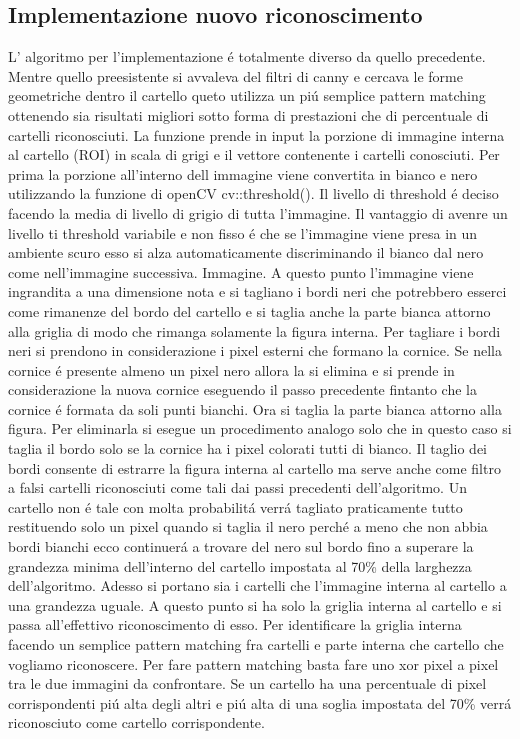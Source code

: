 	\subsection{Implementazione nuovo riconoscimento}
		L' algoritmo per l'implementazione \'e totalmente diverso da quello precedente. Mentre quello preesistente si avvaleva del filtri di canny e cercava le forme geometriche dentro il cartello queto utilizza un pi\'u semplice pattern matching ottenendo sia risultati migliori sotto forma di prestazioni che di percentuale di cartelli riconosciuti.\newline
		La funzione prende in input la porzione di immagine interna al cartello (ROI) in scala di grigi e il vettore contenente i cartelli conosciuti. Per prima la porzione all'interno dell immagine viene convertita in bianco e nero utilizzando la funzione di openCV cv::threshold(). Il livello di threshold \'e deciso facendo la media di livello di grigio di tutta l'immagine. Il vantaggio di avenre un livello ti threshold variabile e non fisso \'e che se l'immagine viene presa in un ambiente scuro esso si alza automaticamente discriminando il bianco dal nero come nell'immagine successiva.
		Immagine.
		\newline A questo punto l'immagine viene ingrandita a una dimensione nota e si tagliano i bordi neri che potrebbero esserci come rimanenze del bordo del cartello e si taglia anche la parte bianca attorno alla griglia di modo che rimanga solamente la figura interna. Per tagliare i bordi neri si prendono in considerazione i pixel esterni che formano la cornice. Se nella cornice \'e presente almeno un pixel nero allora la si elimina e si prende in considerazione la nuova cornice eseguendo il passo precedente fintanto che la cornice \'e formata da soli punti bianchi. Ora si taglia la parte bianca attorno alla figura. Per eliminarla si esegue un procedimento analogo solo che in questo caso si taglia il bordo solo se la cornice ha i pixel colorati tutti di bianco. Il taglio dei bordi consente di estrarre la figura interna al cartello ma serve anche come filtro a falsi cartelli riconosciuti come tali dai passi precedenti dell'algoritmo. Un cartello non \'e tale con molta probabilit\'a verr\'a tagliato praticamente tutto restituendo solo un pixel quando si taglia il nero perch\'e a meno che non abbia bordi bianchi ecco continuer\'a a trovare del nero sul bordo fino a superare la grandezza minima dell'interno del cartello impostata al 70\% della larghezza dell'algoritmo.
		\newline
		Adesso si portano sia i cartelli che l'immagine interna al cartello a una grandezza uguale.
		A questo punto si ha solo la griglia interna al cartello e si passa all'effettivo riconoscimento di esso. Per identificare la griglia interna facendo un semplice pattern matching fra cartelli e parte interna che cartello che vogliamo riconoscere. Per fare pattern matching basta fare uno xor pixel a pixel tra le due immagini da confrontare. Se un cartello ha una percentuale di pixel corrispondenti pi\'u alta degli altri e pi\'u alta di una soglia impostata del 70\% verr\'a riconosciuto come cartello corrispondente.
		

